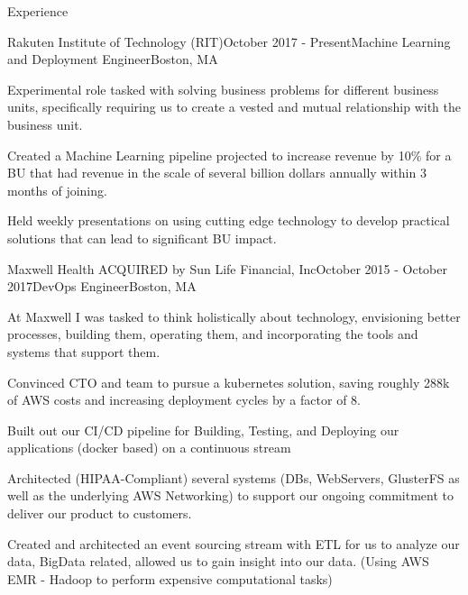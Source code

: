 \documentclass{resume} %
\begin{document}
\begin{rSection}{Experience}


\begin{rSubsection}{Rakuten Institute of Technology (RIT)}{October 2017 - Present}{Machine Learning and Deployment Engineer}{Boston, MA}
 	      \item Experimental role tasked with solving business problems for different business units, specifically requiring us to create a vested and mutual relationship with the business unit.
	  \item Created a Machine Learning pipeline projected to increase revenue by 10\% for a BU that had revenue in the scale of several billion dollars annually within 3 months of joining.       
          \item Held weekly presentations on using cutting edge technology to develop practical solutions that can lead to significant BU impact. 
\end{rSubsection}

 

\begin{rSubsection}{Maxwell Health ACQUIRED by Sun Life Financial, Inc}{October 2015 - October 2017}{DevOps Engineer}{Boston, MA}
\item At Maxwell I was tasked to think holistically about technology, envisioning better processes, building them, operating them, and incorporating the tools and systems that support them.
\item Convinced CTO and team to pursue a kubernetes solution, saving roughly 288k of AWS costs and increasing deployment cycles by a factor of 8. 
\item Built out our CI/CD pipeline for Building, Testing, and Deploying our applications (docker based) on a continuous stream
\item Architected (HIPAA-Compliant) several systems (DBs, WebServers, GlusterFS as well as the underlying AWS Networking) to support our ongoing commitment to deliver our product to customers.
\item Created and architected an event sourcing stream with ETL for us to analyze our data, BigData related, allowed us to gain insight into our data. (Using AWS EMR - Hadoop to perform expensive computational tasks)
\end{rSubsection}



\end{rSection}
\end{document}
